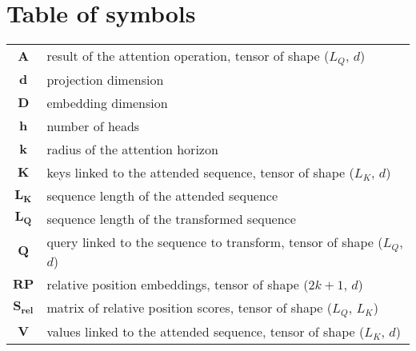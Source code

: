 \section*{Table of symbols}

\begin{tabular}{cp{}}
	$\boldsymbol{A}$ & result of the attention operation, tensor of shape ($L_Q$, $d$)\\
	$\boldsymbol{d}$ & projection dimension\\
	$\boldsymbol{D}$ & embedding dimension\\
	$\boldsymbol{h}$ & number of heads\\
	$\boldsymbol{k}$ & radius of the attention horizon\\
	$\boldsymbol{K}$ & keys linked to the attended sequence, tensor of shape ($L_K$, $d$)\\
	$\boldsymbol{L_K}$ & sequence length of the attended sequence\\
	$\boldsymbol{L_Q}$ & sequence length of the transformed sequence\\
	$\boldsymbol{Q}$ & query linked to the sequence to transform, tensor of shape ($L_Q$, $d$)\\
	$\boldsymbol{RP}$ & relative position embeddings, tensor of shape ($2k+1$, $d$)\\
	$\boldsymbol{S_{rel}}$ & matrix of relative position scores, tensor of shape ($L_Q$, $L_K$)\\
	$\boldsymbol{V}$ & values linked to the attended sequence, tensor of shape ($L_K$, $d$)\\
\end{tabular}

\endinput